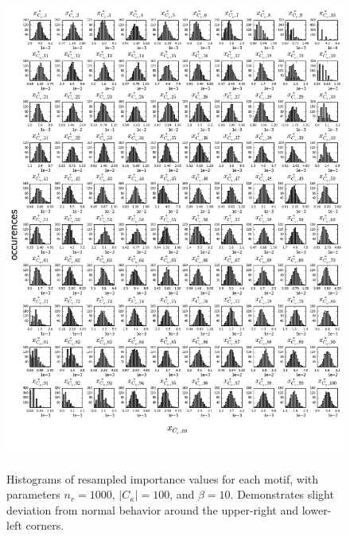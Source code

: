 \begin{enumerate}
\begin{figure}
  \includegraphics[scale=0.35]{./Figures/10x10hist_ck100.png}\\
  \caption{Histograms of resampled importance values for each motif, with parameters $n_r=1000$, $|C_\kappa|=100$, and $\beta=10$. Demonstrates slight deviation from normal behavior around the upper-right and lower-left corners.}\label{fig:10x10_hist_ck100}
\end{figure}
\begin{figure}

\end{figure}
\end{enumerate}
